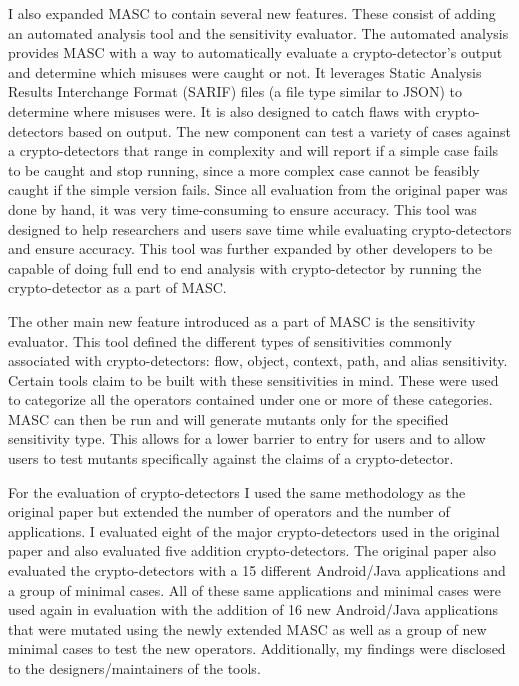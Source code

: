 I also expanded MASC to contain several new features. These consist of adding an automated analysis tool and the sensitivity evaluator. The automated analysis provides MASC with a way to automatically evaluate a crypto-detector's output and determine which misuses were caught or not. It leverages Static Analysis Results Interchange Format (SARIF) files (a file type similar to JSON) to determine where misuses were. It is also designed to catch flaws with crypto-detectors based on output. The new component can test a variety of cases against a crypto-detectors that range in complexity and will report if a simple case fails to be caught and stop running, since a more complex case cannot be feasibly caught if the simple version fails. Since all evaluation from the original paper was done by hand, it was very time-consuming to ensure accuracy. This tool was designed to help researchers and users save time while evaluating crypto-detectors and ensure accuracy. This tool was further expanded by other developers to be capable of doing full end to end analysis with crypto-detector by running the crypto-detector as a part of MASC.

The other main new feature introduced as a part of MASC is the sensitivity evaluator. This tool defined the different types of sensitivities commonly associated with crypto-detectors: flow, object, context, path, and alias sensitivity. Certain tools claim to be built with these sensitivities in mind. These were used to categorize all the operators contained under one or more of these categories. MASC can then be run and will generate mutants only for the specified sensitivity type. This allows for a lower barrier to entry for users and to allow users to test mutants specifically against the claims of a crypto-detector. 

For the evaluation of crypto-detectors I used the same methodology as the original paper but extended the number of operators and the number of applications. I evaluated eight of the major crypto-detectors used in the original paper and also evaluated five addition crypto-detectors. The original paper also evaluated the crypto-detectors with a 15 different Android/Java applications and a group of minimal cases. All of these same applications and minimal cases were used again in evaluation with the addition of 16 new Android/Java applications that were mutated using the newly extended MASC as well as a group of new minimal cases to test the new operators. Additionally, my findings were disclosed to the designers/maintainers of the tools. 


